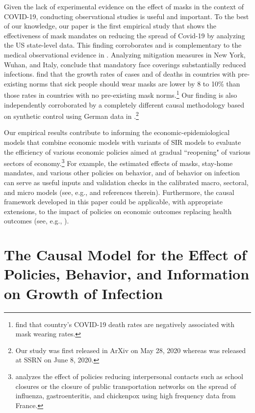 \documentclass[11pt,reqno,letter]{amsart}
\theoremstyle{definition}
\begin{document}
Given the lack of experimental evidence on the effect of masks in the context of COVID-19, conducting observational studies  is useful and important. To the best of our knowledge, our paper is the first  empirical study that shows the effectiveness of  mask mandates on reducing the spread of Covid-19 by analyzing the US state-level data. This finding corroborates and is complementary to the medical observational evidence in \cite{howard2020}. Analyzing mitigation measures in New York, Wuhan, and Italy, \cite{zhangr2020} conclude that mandatory face coverings substantially reduced infections. \cite{abaluck2020}  find that the growth rates of cases and of deaths in countries with pre-existing norms that sick people should wear masks are lower by 8 to 10\% than those rates in countries with no pre-existing mask norms.\footnote{\cite{miyazawa2020} find that  country's COVID-19 death rates are negatively associated with mask wearing rates.} Our finding is also independently corroborated by a completely different causal methodology based on synthetic control
using German data in \cite{Mitze2020}.\footnote{Our study was first released in ArXiv on May 28, 2020 whereas
 \cite{Mitze2020} was released at SSRN on June 8, 2020.}

Our empirical results contribute to informing the economic-epidemiological models that combine economic models with variants of SIR models to evaluate the efficiency of various economic policies aimed at gradual ``reopening" of various sectors of economy.\footnote{\cite{adda2016} analyzes the effect of policies reducing interpersonal contacts such as school closures or the closure of public transportation networks on the spread of  influenza, gastroenteritis, and chickenpox using high frequency data from France.} For example, the estimated effects of masks, stay-home mandates, and various other policies on behavior, and of behavior on infection can serve as useful inputs and validation checks in the calibrated macro, sectoral, and micro models (see, e.g., \cite{alvarez2020simple,baqaee2020reopening,NBERw27128,acemoglu2020multi,lsmith,nashSIR} and references therein). Furthermore, the causal framework developed in this paper could be applicable, with appropriate extensions, to the impact of policies on economic outcomes replacing health outcomes (see, e.g., \cite{chetty2020real,coibion2020labor}).



\section{The Causal Model for the Effect of Policies, Behavior, and Information on Growth of Infection}\label{sec:causal-model}
\end{document}
